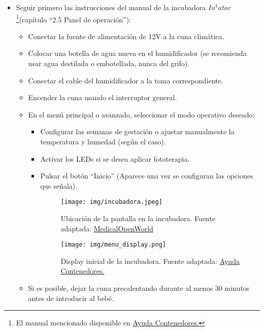 \begin{itemize}
    \item Seguir primero las instrucciones del manual de la incubadora \textit{In$^3$ator} \footnote{El manual mencionado disponible en \href{https://ayudacontenedores.org/storage/2021/11/in3ator_user_manual-v1.0-Spanish.pdf}{Ayuda Contenedores.}}(capítulo “2.5 Panel de operación”):
    \begin{itemize}
        \item Conectar la fuente de alimentación de 12V a la cuna climática.
        \item Colocar una botella de agua nueva en el humidificador (se recomienda usar agua destilada o embotellada, nunca del grifo).
        \item Conectar el cable del humidificador a la toma correspondiente.
        \item Encender la cuna usando el interruptor general.
        \item En el menú principal o avanzado, seleccionar el modo operativo deseado:
        \begin{itemize}
            \item Configurar las semanas de gestación o ajustar manualmente la temperatura y humedad (según el caso).
            \item Activar los LEDs si se desea aplicar fototerapia.
            \item Pulsar el botón “Inicio” (Aparece una vez se configuran las opciones que señala).
            \begin{figure}[H]
            \centering
            \texttt{[image: img/incubadora.jpeg]}
            \caption{Ubicación de la pantalla en la incubadora. Fuente adaptada: \href{https://medicalopenworld.org/la-incubadora/}{MedicalOpenWorld}}
            \label{fig:pantalla_incubadora}
            \end{figure}
    
            \begin{figure}[H]
            \centering
            \texttt{[image: img/menu\_display.png]}
            \caption{Display inicial de la incubadora. Fuente adaptada: \href{https://ayudacontenedores.org/storage/2021/11/in3ator_user_manual-v1.0-Spanish.pdf}{Ayuda Contenedores.} }
            \label{fig:display}
            \end{figure}
        \end{itemize}
    \item Si es posible, dejar la cuna precalentando durante al menos 30 minutos antes de introducir al bebé.
    \end{itemize}
\end{itemize}

